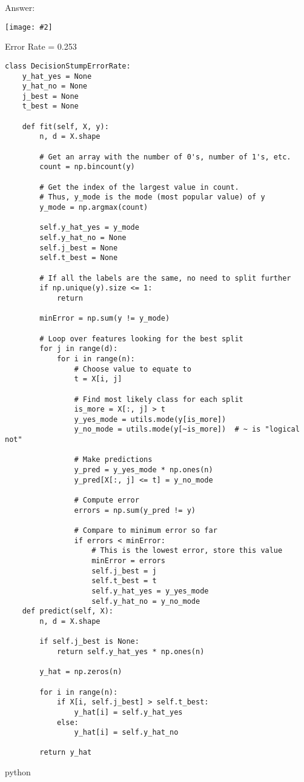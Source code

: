 \documentclass{article}
\newenvironment{answer}{\par\begingroup\color{gre}Answer: }{\endgroup}
\newcommand{\centerfig}[2]{\begin{center}\texttt{[image: \#2]}\end{center}}
\begin{document}
\begin{answer}
\centerfig{0.7}{./figs/DecisionStumpErrorRate_decisionBoundary}
    Error Rate = 0.253
    \begin{verbatim}
class DecisionStumpErrorRate:
    y_hat_yes = None
    y_hat_no = None
    j_best = None
    t_best = None
    
    def fit(self, X, y):
        n, d = X.shape

        # Get an array with the number of 0's, number of 1's, etc.
        count = np.bincount(y)

        # Get the index of the largest value in count.
        # Thus, y_mode is the mode (most popular value) of y
        y_mode = np.argmax(count)

        self.y_hat_yes = y_mode
        self.y_hat_no = None
        self.j_best = None
        self.t_best = None

        # If all the labels are the same, no need to split further
        if np.unique(y).size <= 1:
            return

        minError = np.sum(y != y_mode)

        # Loop over features looking for the best split
        for j in range(d):
            for i in range(n):
                # Choose value to equate to
                t = X[i, j]

                # Find most likely class for each split
                is_more = X[:, j] > t
                y_yes_mode = utils.mode(y[is_more])
                y_no_mode = utils.mode(y[~is_more])  # ~ is "logical not"

                # Make predictions
                y_pred = y_yes_mode * np.ones(n)
                y_pred[X[:, j] <= t] = y_no_mode

                # Compute error
                errors = np.sum(y_pred != y)

                # Compare to minimum error so far
                if errors < minError:
                    # This is the lowest error, store this value
                    minError = errors
                    self.j_best = j
                    self.t_best = t
                    self.y_hat_yes = y_yes_mode
                    self.y_hat_no = y_no_mode
    def predict(self, X):
        n, d = X.shape

        if self.j_best is None:
            return self.y_hat_yes * np.ones(n)

        y_hat = np.zeros(n)

        for i in range(n):
            if X[i, self.j_best] > self.t_best:
                y_hat[i] = self.y_hat_yes
            else:
                y_hat[i] = self.y_hat_no

        return y_hat
    \end{verbatim}{python}
\end{answer}
\end{document}
